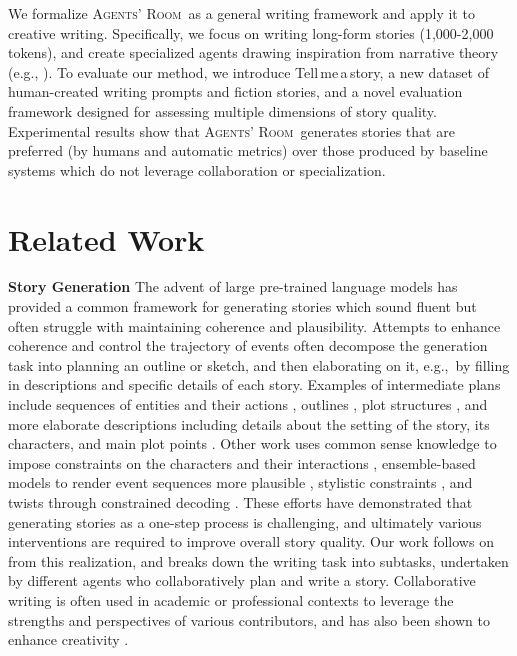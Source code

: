 \documentclass{article}
\newcommand{\Agentsroom}{\textsc{Agents' Room}}
\newcommand{\tellmeastory}{{\sc Tell$\,$me$\,$a$\,$story}}
\newcommand{\mirella}[1]{{\textcolor{cyan}{\bf{Mirella:} \emph{#1}}}}
\begin{document}
We formalize \Agentsroom\ as a general writing framework and apply it
to creative writing. Specifically, we focus on writing long-form
stories (1,000-2,000 tokens), and create specialized agents drawing
inspiration from narrative theory (e.g., \citealt{card:1999,noble:1999,pavis1998dictionary}). To evaluate our
method, we introduce \tellmeastory, a new dataset of human-created writing
prompts and fiction stories, and a novel evaluation framework designed
for assessing multiple dimensions of story quality. Experimental
results show that \Agentsroom\ generates stories that are preferred (by
humans and automatic metrics) over those produced by baseline systems
which do not leverage collaboration or specialization.

\section{Related Work}
\label{sec:related_work}


\textbf{Story Generation} The advent of large pre-trained language
models has provided a common framework for generating stories which
sound fluent but often struggle with maintaining coherence and
plausibility.  Attempts to enhance coherence and control the
trajectory of events often decompose the generation task into planning
an outline or sketch, and then elaborating on it, e.g.,~by filling in
descriptions and specific details of each story. Examples of
intermediate plans include sequences of entities and their actions
\citep{yao2019plan}, outlines
\citep{fan-etal-2019-strategies,zhou2023recurrentgptinteractivegenerationarbitrarily,wang-etal-2023-improving-pacing},
plot structures \citep{goldfarb-tarrant-etal-2020-content}, and more
elaborate descriptions including details about the setting of the
story, its characters, and main plot points
\citep{yang-etal-2022-re3,yang-etal-2023-doc}. Other work uses common
sense knowledge to impose constraints on the characters and their
interactions \citep{peng-etal-2022-inferring}, ensemble-based models
to render event sequences more plausible
\citep{Ammanabrolu_Tien_Cheung_Luo_Ma_Martin_Riedl_2020}, 
stylistic constraints \citep{kong-etal-2021-stylized}, and 
twists through constrained decoding \citep{huang-etal-2023-affective}.
These efforts have demonstrated that generating stories as a one-step
process is challenging, and ultimately various interventions are
required to improve overall story quality. Our work follows on from
this realization, and breaks down the writing task into subtasks,
undertaken by different agents who collaboratively plan and write a
story. Collaborative writing is often used in academic or professional contexts to leverage the strengths
and perspectives of various contributors, and has also been shown to
enhance creativity \citep{barrett:ea:2021}. 
\end{document}
